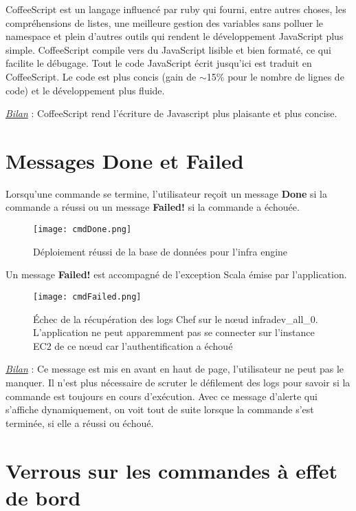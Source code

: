 CoffeeScript est un langage influencé par ruby qui fourni, entre autres choses,
les compréhensions de listes, une meilleure gestion des variables sans polluer
le namespace et plein d'autres outils qui rendent le développement JavaScript
plus simple. CoffeeScript compile vers du JavaScript lisible et bien formaté,
ce qui facilite le débugage.
Tout le code JavaScript écrit jusqu'ici est traduit en CoffeeScript.
Le code est plus concis (gain de $\sim$15\% pour le nombre de lignes de code) et le
développement plus fluide.

\underline{\textit{Bilan}} : CoffeeScript rend l'écriture de Javascript plus
plaisante et plus concise.

\section{Messages Done et Failed}

Lorsqu'une commande se termine, l'utilisateur reçoit un message \textbf{Done} si la
commande a réussi ou un message \textbf{Failed!} si la commande a échouée.

\begin{figure}[H]
  \texttt{[image: cmdDone.png]}
  \caption{Déploiement réussi de la base de données pour l'infra engine}
\end{figure}

Un message \textbf{Failed!} est accompagné de l'exception Scala émise par
l'application.

\begin{figure}[H]
  \texttt{[image: cmdFailed.png]}
  \caption{Échec de la récupération des logs Chef sur le nœud infradev\_all\_0.\\
    L'application ne peut apparemment pas se connecter sur l'instance EC2 de
    ce nœud car l'authentification a échoué}
\end{figure}

\underline{\textit{Bilan}} : Ce message est mis en avant en haut de page,
l'utilisateur ne peut pas le manquer.
Il n'est plus nécessaire de scruter le défilement des logs pour savoir si la
commande est toujours en cours d'exécution. Avec ce message d'alerte qui
s'affiche dynamiquement, on voit tout de suite lorsque la commande s'est
terminée, si elle a réussi ou échoué.

\section{Verrous sur les commandes à effet de bord}

